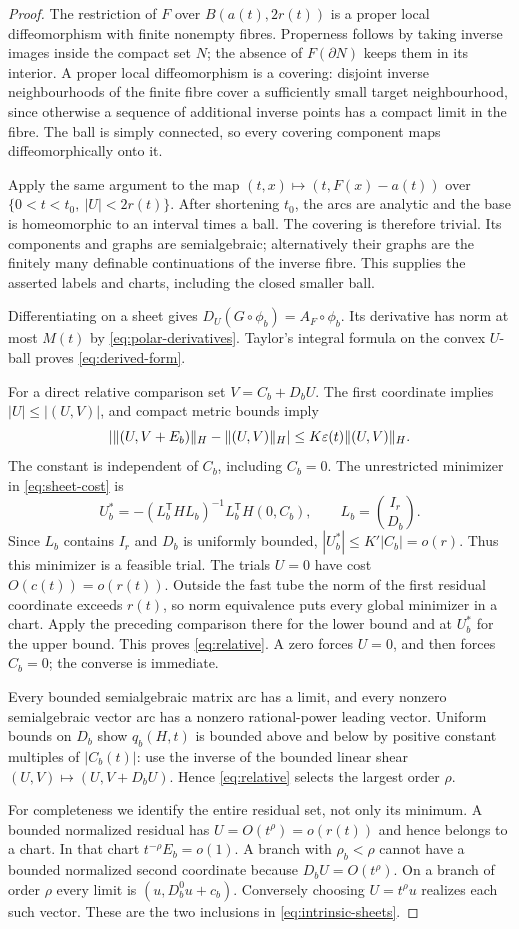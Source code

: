 \begin{proof}
The restriction of $F$ over $B(a(t),2r(t))$ is a proper local diffeomorphism with finite nonempty fibres. Properness follows by taking inverse images inside the compact set $N$; the absence of $F(\partial N)$ keeps them in its interior. A proper local diffeomorphism is a covering: disjoint inverse neighbourhoods of the finite fibre cover a sufficiently small target neighbourhood, since otherwise a sequence of additional inverse points has a compact limit in the fibre. The ball is simply connected, so every covering component maps diffeomorphically onto it.

Apply the same argument to the map $(t,x)\mapsto(t,F(x)-a(t))$ over
$\{0<t<t_0,\ |U|<2r(t)\}$. After shortening $t_0$, the arcs are analytic and the base is homeomorphic to an interval times a ball. The covering is therefore trivial. Its components and graphs are semialgebraic; alternatively their graphs are the finitely many definable continuations of the inverse fibre. This supplies the asserted labels and charts, including the closed smaller ball.

Differentiating on a sheet gives
$D_U(G\circ\phi_b)=A_F\circ\phi_b$. Its derivative has norm at most $M(t)$ by \eqref{eq:polar-derivatives}. Taylor's integral formula on the convex $U$-ball proves \eqref{eq:derived-form}.

For a direct relative comparison set $V=C_b+D_bU$. The first coordinate implies $|U|\le|(U,V)|$, and compact metric bounds imply
\[
 |\|(U,V+E_b)\|_H-\|(U,V)\|_H|
 \le K\varepsilon(t)\|(U,V)\|_H.
\]
The constant is independent of $C_b$, including $C_b=0$. The unrestricted minimizer in \eqref{eq:sheet-cost} is
\[
 U_b^*=-(L_b^{\mathsf T}HL_b)^{-1}L_b^{\mathsf T}H(0,C_b),
 \qquad L_b=\binom{I_r}{D_b}.
\]
Since $L_b$ contains $I_r$ and $D_b$ is uniformly bounded, $|U_b^*|\le K'|C_b|=o(r)$. Thus this minimizer is a feasible trial. The trials $U=0$ have cost $O(c(t))=o(r(t))$. Outside the fast tube the norm of the first residual coordinate exceeds $r(t)$, so norm equivalence puts every global minimizer in a chart. Apply the preceding comparison there for the lower bound and at $U_b^*$ for the upper bound. This proves \eqref{eq:relative}. A zero forces $U=0$, and then forces $C_b=0$; the converse is immediate.

Every bounded semialgebraic matrix arc has a limit, and every nonzero semialgebraic vector arc has a nonzero rational-power leading vector. Uniform bounds on $D_b$ show $q_b(H,t)$ is bounded above and below by positive constant multiples of $|C_b(t)|$: use the inverse of the bounded linear shear $(U,V)\mapsto(U,V+D_bU)$. Hence \eqref{eq:relative} selects the largest order $\rho$.

For completeness we identify the entire residual set, not only its minimum. A bounded normalized residual has $U=O(t^\rho)=o(r(t))$ and hence belongs to a chart. In that chart $t^{-\rho}E_b=o(1)$. A branch with $\rho_b<\rho$ cannot have a bounded normalized second coordinate because $D_bU=O(t^\rho)$. On a branch of order $\rho$ every limit is $(u,D_b^0u+c_b)$. Conversely choosing $U=t^\rho u$ realizes each such vector. These are the two inclusions in \eqref{eq:intrinsic-sheets}.
\end{proof}

